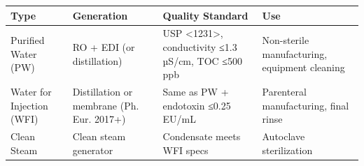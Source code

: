 \documentclass[
  11pt,
  a4paper,
]{report}
\begin{document}
\begin{longtable}[]{@{}llll@{}}
\toprule
\begin{minipage}[b]{0.14\columnwidth}\raggedright
Type\strut
\end{minipage} & \begin{minipage}[b]{0.25\columnwidth}\raggedright
Generation\strut
\end{minipage} & \begin{minipage}[b]{0.39\columnwidth}\raggedright
Quality Standard\strut
\end{minipage} & \begin{minipage}[b]{0.11\columnwidth}\raggedright
Use\strut
\end{minipage}\tabularnewline
\midrule
\endhead
\begin{minipage}[t]{0.14\columnwidth}\raggedright
Purified Water (PW)\strut
\end{minipage} & \begin{minipage}[t]{0.25\columnwidth}\raggedright
RO + EDI (or distillation)\strut
\end{minipage} & \begin{minipage}[t]{0.39\columnwidth}\raggedright
USP \textless1231\textgreater, conductivity ≤1.3 µS/cm, TOC ≤500
ppb\strut
\end{minipage} & \begin{minipage}[t]{0.11\columnwidth}\raggedright
Non-sterile manufacturing, equipment cleaning\strut
\end{minipage}\tabularnewline
\begin{minipage}[t]{0.14\columnwidth}\raggedright
Water for Injection (WFI)\strut
\end{minipage} & \begin{minipage}[t]{0.25\columnwidth}\raggedright
Distillation or membrane (Ph. Eur. 2017+)\strut
\end{minipage} & \begin{minipage}[t]{0.39\columnwidth}\raggedright
Same as PW + endotoxin ≤0.25 EU/mL\strut
\end{minipage} & \begin{minipage}[t]{0.11\columnwidth}\raggedright
Parenteral manufacturing, final rinse\strut
\end{minipage}\tabularnewline
\begin{minipage}[t]{0.14\columnwidth}\raggedright
Clean Steam\strut
\end{minipage} & \begin{minipage}[t]{0.25\columnwidth}\raggedright
Clean steam generator\strut
\end{minipage} & \begin{minipage}[t]{0.39\columnwidth}\raggedright
Condensate meets WFI specs\strut
\end{minipage} & \begin{minipage}[t]{0.11\columnwidth}\raggedright
Autoclave sterilization\strut
\end{minipage}\tabularnewline
\bottomrule
\end{longtable}
\end{document}
